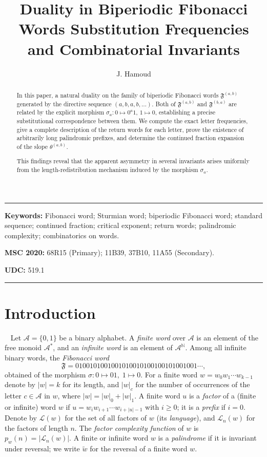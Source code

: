 \documentclass[12pt]{amsart}
\author{J. Hamoud}
\title[Duality in Biperiodic Fibonacci Words]{Duality in Biperiodic Fibonacci Words Substitution Frequencies and Combinatorial Invariants}
\date{}
\theoremstyle{plain}
\theoremstyle{definition}
\theoremstyle{remark}
\newcommand{\N}{\mathbb{N}}
\newcommand{\AlphA}{\mathcal{A}}
\newcommand{\FD}{\mathfrak{F}}
\begin{document}
\begin{abstract}
In this paper, a natural duality on the family of biperiodic Fibonacci words $\mathfrak{F}^{(a,b)}$ generated by the directive sequence $(a,b,a,b,\dots)$. Both of $\mathfrak{F}^{(a,b)}$ and $\mathfrak{F}^{(b,a)}$ are related by the explicit morphism $\sigma_a:0\mapsto 0^a1$, $1\mapsto 0$, establishing a precise substitutional correspondence between them.
We compute the exact letter frequencies, give a complete description of the return words for each letter, prove the existence of arbitrarily long palindromic prefixes, and determine the continued fraction expansion of the slope $\theta^{(a,b)}$. 

This findings reveal that the apparent asymmetry in several invariants  arises uniformly from the length-redistribution mechanism induced by the morphism $\sigma_a$. 
\end{abstract}

\maketitle


\noindent\rule{15.9cm}{1.0pt}

\noindent
\textbf{
Keywords:} Fibonacci word; Sturmian word; biperiodic Fibonacci word; standard sequence; continued fraction; critical exponent; return words; palindromic complexity; combinatorics on words.


\medskip

\noindent
{\bf
MSC 2020:} 68R15 (Primary); 11B39, 37B10, 11A55 (Secondary).

\medskip

\noindent
{\bf
UDC:} 519.1



\noindent\rule{15.9cm}{1.0pt}

\section{Introduction}~\label{sec01intro}
Let $\AlphA=\{0,1\}$ be a binary alphabet. A \emph{finite word} over
$\AlphA$ is an element of the free monoid $\AlphA^{*}$, and an
\emph{infinite word} is an element of $\AlphA^{\N}$. Among all infinite binary words, the
\emph{Fibonacci word}
\[
  \FD = 0100101001001010010100100101001001\cdots,
\]
obtained  of the morphism $\sigma\colon 0\mapsto 01,\;
1\mapsto 0$.  For a finite word
$w=w_0w_1\cdots w_{k-1}$ denote by $|w|=k$ for its length, and $|w|_c$
for the number of occurrences of the letter $c\in\AlphA$ in $w$, where
$|w|=|w|_0+|w|_1$. A finite word $u$ is a \emph{factor} of a (finite or
infinite) word $w$ if $u=w_iw_{i+1}\cdots w_{i+|u|-1}$ with $i\geqslant 0$;
it is a \emph{prefix} if $i=0$. Denote by $\mathcal{L}(w)$ for the set of
all factors of $w$ (its \emph{language}), and $\mathcal{L}_n(w)$ for the
factors of length $n$. The \emph{factor complexity function} of $w$ is
$p_w(n)=|\mathcal{L}_n(w)|$.
A finite or infinite word $w$ is a \emph{palindrome} if it is invariant
under reversal; we write $\widetilde{w}$ for the reversal of a finite
word $w$.
 
\end{document}
